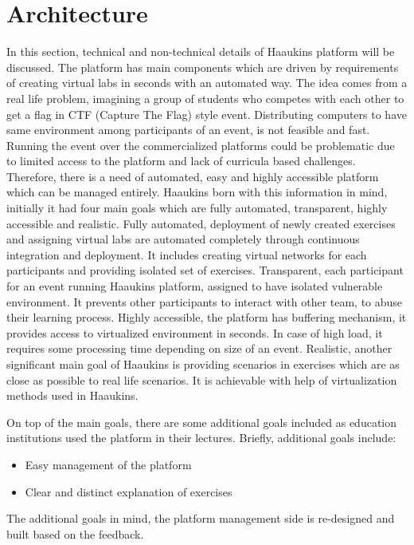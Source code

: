 \chapter{Architecture}\label{chapter:}

In this section, technical and non-technical details of Haaukins platform will be discussed. The platform has main components which are driven by requirements of creating virtual labs in seconds with an automated way.  The idea comes from a real life problem, imagining a group of students who competes with each other to get a flag in CTF (Capture The Flag) style event. Distributing computers to have same environment among participants of an event, is not feasible and fast. Running the event over the commercialized platforms could be problematic due to limited access to the platform and lack of curricula based challenges. Therefore, there is a need of automated, easy and highly accessible platform which can be managed entirely. Haaukins born with this information in mind, initially it had four main goals which are fully automated, transparent, highly accessible and realistic\cite{8820918}. 
Fully automated, deployment of newly created exercises and assigning virtual labs are automated completely through continuous integration and deployment. It includes creating virtual networks for each participants and providing isolated set of exercises. 
Transparent, each participant for an event running Haaukins platform, assigned to have isolated vulnerable environment. It prevents other participants to interact with other team, to abuse their learning process. 
Highly accessible, the platform has buffering mechanism, it provides access to virtualized environment in seconds. In case of high load, it requires some processing time depending on size of an event. 
Realistic, another significant main goal of Haaukins is providing scenarios in exercises which are as close as possible to real life scenarios. It is achievable with help of virtualization methods used in Haaukins. 

On top of the main goals, there are some additional goals included as education institutions used the platform in their lectures. Briefly, additional goals include: 
\begin{itemize}
    \item Easy management of the platform
    \item Clear and distinct explanation of exercises 
\end{itemize}

The additional goals in mind, the platform management side is re-designed and built based on the feedback. 

